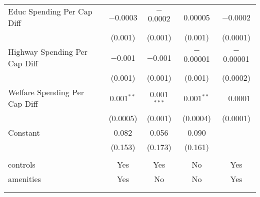 \begin{table}[!htbp]
\begin{tabular}{@{\extracolsep{5pt}}lcccc}
  Educ Spending Per Cap Diff & $-$0.0003 & $-$0.0002 & 0.00005 & $-$0.0002 \\ 
  & (0.001) & (0.001) & (0.001) & (0.0001) \\ 
  Highway Spending Per Cap Diff & $-$0.001 & $-$0.001 & $-$0.00001 & $-$0.00001 \\ 
  & (0.001) & (0.001) & (0.001) & (0.0002) \\ 
  Welfare Spending Per Cap Diff & 0.001$^{**}$ & 0.001$^{***}$ & 0.001$^{**}$ & $-$0.0001 \\ 
  & (0.0005) & (0.001) & (0.0004) & (0.0001) \\ 
  Constant & 0.082 & 0.056 & 0.090 &  \\ 
  & (0.153) & (0.173) & (0.161) &  \\ 
 \hline \\[-1.8ex] 
controls & Yes & Yes & No & Yes \\ 
amenities & Yes & No & No & Yes \\ 
\hline \\[-1.8ex] 
\hline 
\hline \\[-1.8ex] 
\end{tabular} 
\end{table} 
